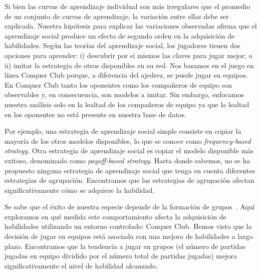 \documentclass[a4paper,11pt]{book}
\theoremstyle{definition}
\begin{document}
Si bien las curvas de aprendizaje individual son más irregulares que el promedio de un conjunto de curvas de aprendizaje, la variación entre ellas debe ser explicada.
%
Nuestra hipótesis para explicar las variaciones observadas afirma que el aprendizaje social produce un efecto de segundo orden en la adquisición de habilidades.
%
Según las teorías del aprendizaje social, los jugadores tienen dos opciones para aprender: i) descubrir por sí mismos las claves para jugar mejor; o ii) imitar la estrategia de otros disponibles en su red.
%
Nos basamos en el juego en línea Conquer Club porque, a diferencia del ajedrez, se puede jugar en equipos.
%
En Conquer Club tanto los oponentes como los compañeros de equipo son observables y, en consecuencia, son modelos a imitar.
%
Sin embargo, enfocamos nuestro análisis solo en la lealtad de los compañeros de equipo ya que la lealtad en los oponentes no está presente en nuestra base de datos.


Por ejemplo, una estrategia de aprendizaje social simple consiste en copiar la mayoría de los otros modelos disponibles, lo que se conoce como \emph{frequency-based strategy}.
%
Otra estrategia de aprendizaje social es copiar el modelo disponible más exitoso, denominado como \emph{payoff-based strategy}.
%
Hasta donde sabemos, no se ha propuesto ninguna estrategia de aprendizaje social que tenga en cuenta diferentes estrategias de agrupación.
%
Encontramos que las estrategias de agrupación afectan significativamente cómo se adquiere la habilidad.


Se sabe que el éxito de nuestra especie depende de la formación de grupos~\cite{Richerson2010,dunbar1993-coevolutionNeocorticalSizeGroupSizeAndLanguage}.
%
Aquí exploramos en qué medida este comportamiento afecta la adquisición de habilidades utilizando un entorno controlado: Conquer Club.
%
Hemos visto que la decisión de jugar en equipos está asociada con una mejora de habilidades a largo plazo.
%
Encontramos que la tendencia a jugar en grupos (el número de partidas jugadas en equipo dividido por el número total de partidas jugadas) mejora significativamente el nivel de habilidad alcanzado.

\end{document}
